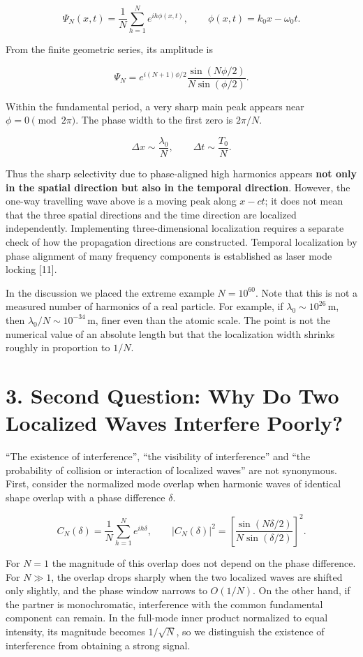 \documentclass[
  a4paper,
]{article}
\begin{document}
\[
\Psi_N(x,t)=\frac1N\sum_{h=1}^{N}e^{ih\phi(x,t)},
\qquad \phi(x,t)=k_0x-\omega_0t.
\]

From the finite geometric series, its amplitude is

\[
\Psi_N=e^{i(N+1)\phi/2}
\frac{\sin(N\phi/2)}{N\sin(\phi/2)}.
\]

Within the fundamental period, a very sharp main peak appears near
\(\phi=0\pmod{2\pi}\). The phase width to the first zero is \(2\pi/N\).

\[
\Delta x\sim\frac{\lambda_0}{N},
\qquad
\Delta t\sim\frac{T_0}{N}.
\]

Thus the sharp selectivity due to phase-aligned high harmonics appears
\textbf{not only in the spatial direction but also in the temporal
direction}. However, the one-way travelling wave above is a moving peak
along \(x-ct\); it does not mean that the three spatial directions and
the time direction are localized independently. Implementing
three-dimensional localization requires a separate check of how the
propagation directions are constructed. Temporal localization by phase
alignment of many frequency components is established as laser mode
locking {[}11{]}.

In the discussion we placed the extreme example \(N=10^{60}\). Note that
this is not a measured number of harmonics of a real particle. For
example, if \(\lambda_0\sim10^{26}\,\mathrm m\), then
\(\lambda_0/N\sim10^{-34}\,\mathrm m\), finer even than the atomic
scale. The point is not the numerical value of an absolute length but
that the localization width shrinks roughly in proportion to \(1/N\).

\section{3. Second Question: Why Do Two Localized Waves Interfere
Poorly?}\label{second-question-why-do-two-localized-waves-interfere-poorly}

``The existence of interference'', ``the visibility of interference''
and ``the probability of collision or interaction of localized waves''
are not synonymous. First, consider the normalized mode overlap when
harmonic waves of identical shape overlap with a phase difference
\(\delta\).

\[
C_N(\delta)=\frac1N\sum_{h=1}^N e^{ih\delta},
\qquad
|C_N(\delta)|^2=
\left[\frac{\sin(N\delta/2)}{N\sin(\delta/2)}\right]^2.
\]

For \(N=1\) the magnitude of this overlap does not depend on the phase
difference. For \(N\gg1\), the overlap drops sharply when the two
localized waves are shifted only slightly, and the phase window narrows
to \(O(1/N)\). On the other hand, if the partner is monochromatic,
interference with the common fundamental component can remain. In the
full-mode inner product normalized to equal intensity, its magnitude
becomes \(1/\sqrt N\), so we distinguish the existence of interference
from obtaining a strong signal.
\end{document}
